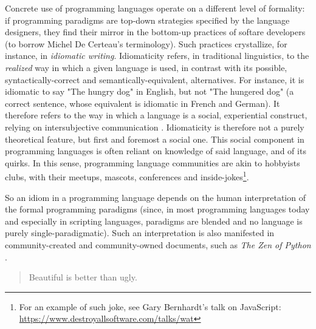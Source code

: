 Concrete use of programming languages operate on a different level of formality: if programming paradigms are top-down strategies specified by the language designers, they find their mirror in the bottom-up practices of softare developers (to borrow Michel De Certeau's terminology). Such practices crystallize, for instance, in \emph{idiomatic writing}. Idiomaticity refers, in traditional linguistics, to the \emph{realized} way in which a given language is used, in contrast with its possible, syntactically-correct and semantically-equivalent, alternatives. For instance, it is idiomatic to say "The hungry dog" in English, but not "The hungered dog" (a correct sentence, whose equivalent is idiomatic in French and German). It therefore refers to the way in which a language is a social, experiential construct, relying on intersubjective communication \citep{voloshinov_marxism_1986}. Idiomaticity is therefore not a purely theoretical feature, but first and foremost a social one. This social component in programming languages is often reliant on knowledge of said language, and of its quirks. In this sense, programming language communities are akin to hobbyists clubs, with their meetups, mascots, conferences and inside-jokes\footnote{For an example of such joke, see Gary Bernhardt's talk on JavaScript: \url{https://www.destroyallsoftware.com/talks/wat}}.

So an idiom in a programming language depends on the human interpretation of the formal programming paradigms (since, in most programming languages today and especially in scripting languages, paradigms are blended and no language is purely single-paradigmatic). Such an interpretation is also manifested in community-created and community-owned documents, such as \emph{The Zen of Python} \citep{peters_code_1999}.


\begin{quote}
  Beautiful is better than ugly.
\end{quote}

